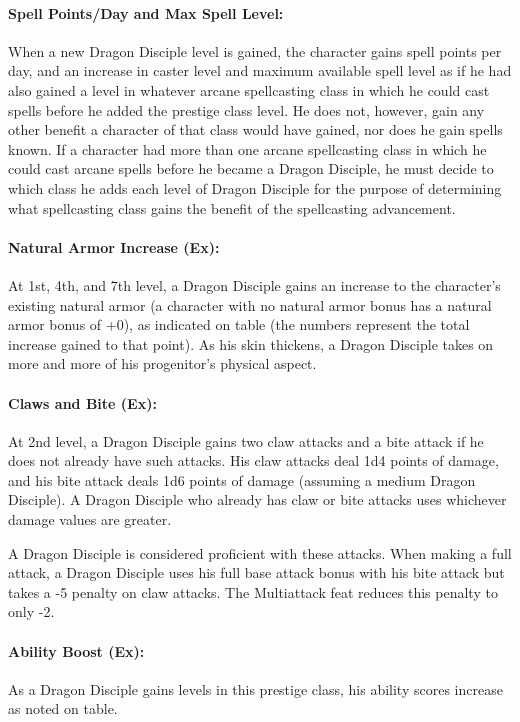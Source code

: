 \paragraph{Spell Points/Day and Max Spell Level:} 
When a new Dragon Disciple level is gained, the character gains spell points per day, and an increase in caster level and maximum available spell level as if he had also gained a level in whatever arcane spellcasting class in which he could cast spells before he added the prestige class level. 
He does not, however, gain any other benefit a character of that class would have gained, nor does he gain spells known. 
If a character had more than one arcane spellcasting class in which he could cast arcane spells before he became a Dragon Disciple, 
he must decide to which class he adds each level of Dragon Disciple for the purpose of determining what spellcasting class gains the benefit of the spellcasting advancement.

\paragraph{Natural Armor Increase (Ex):}
At 1st, 4th, and 7th level, a Dragon Disciple gains an increase to the character's existing natural armor 
(a character with no natural armor bonus has a natural armor bonus of +0), as indicated on 
 table (the numbers represent the total increase gained to that point). 
As his skin thickens, a Dragon Disciple takes on more and more of his progenitor's physical aspect.

\paragraph{Claws and Bite (Ex):}
At 2nd level, a Dragon Disciple gains two claw attacks and a bite attack if he does not already have such attacks. 
His claw attacks deal 1d4 points of damage, and his bite attack deals 1d6 points of damage (assuming a medium Dragon Disciple).
A Dragon Disciple who already has claw or bite attacks uses whichever damage values are greater.

A Dragon Disciple is considered proficient with these attacks. When making a full attack, 
a Dragon Disciple uses his full base attack bonus with his bite attack but takes a -5 penalty on claw attacks. 
The Multiattack feat reduces this penalty to only -2.

\paragraph{Ability Boost (Ex):}
As a Dragon Disciple gains levels in this prestige class, his ability scores increase as noted on  table.

